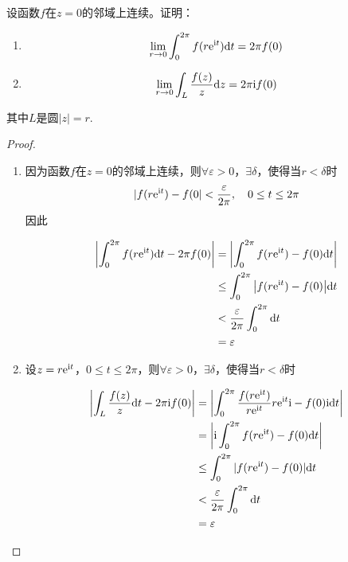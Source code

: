 \begin{proposition}

    设函数$f$在$z = 0$的邻域上连续。证明：

    \begin{enumerate}

        \item \[\lim\limits_{r \to 0}{\int_{0}^{2 \pi}{f(r\mathrm{e}^{\mathrm{i} t})}\mathrm{d} t} = 2 \pi f(0)\]
        
        \item \[ \lim\limits_{r \to 0}{\int_{L}{\dfrac{f(z)}{z}}\mathrm{d} z} = 2 \pi \mathrm{i} f(0)\]
        
    \end{enumerate}

    其中$L$是圆$|z| = r$.

\end{proposition}

\begin{proof}

    \begin{enumerate}

        \item 
            因为函数$f$在$z = 0$的邻域上连续，则$\forall \varepsilon > 0$，$\exists \delta$，使得当$r < \delta$时
            \[|f(r\mathrm{e}^{\mathrm{i} t}) - f(0| < \dfrac{\varepsilon}{2 \pi}, \quad 0 \leq t \leq 2 \pi\]
            因此

            \begin{align*}
                \left| \int_{0}^{2 \pi}{f(r\mathrm{e}^{\mathrm{i} t})}\mathrm{d} t - 2 \pi f(0) \right| & = \left| \int_{0}^{2 \pi}{f(r\mathrm{e}^{\mathrm{i} t}) - f(0)}\mathrm{d} t \right| \\
                & \leq \int_{0}^{2 \pi}{\left| f(r\mathrm{e}^{\mathrm{i} t}) - f(0) \right|}\mathrm{d} t \\
                & < \dfrac{\varepsilon}{2 \pi}\int_{0}^{2 \pi}\mathrm{d} t \\
                & = \varepsilon
            \end{align*}

        \item 
            设$z = r\mathrm{e}^{\mathrm{i} t}$，$0 \leq t \leq 2 \pi$，则$\forall \varepsilon > 0$，$\exists \delta$，使得当$r < \delta$时

            \begin{align*}
                \left| \int_{L}{\dfrac{f(z)}{z}}\mathrm{d} t - 2 \pi \mathrm{i} f(0) \right| & = \left| \int_{0}^{2 \pi}{\dfrac{f(r\mathrm{e}^{\mathrm{i} t})}{r\mathrm{e}^{\mathrm{i} t}}r\mathrm{e}^{\mathrm{i} t} \mathrm{i} - f(0)\mathrm{i}}\mathrm{d} t \right| \\
                & = \left| \mathrm{i} \int_{0}^{2 \pi}{f(r\mathrm{e}^{\mathrm{i} t}) - f(0)}\mathrm{d} t \right| \\
                & \leq \int_{0}^{2 \pi}{|f(r\mathrm{e}^{\mathrm{i} t}) - f(0)|}\mathrm{d} t \\
                & < \dfrac{\varepsilon}{2 \pi}\int_{0}^{2 \pi}\mathrm{d} t \\
                & = \varepsilon
            \end{align*}

    \end{enumerate}

\end{proof}

